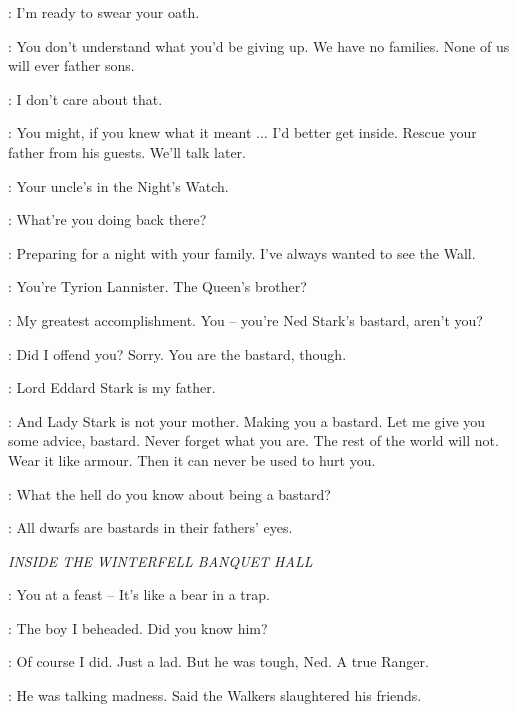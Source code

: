 \JON: I'm ready to swear your oath. 

\BENJEN: You don't understand what you'd be giving up. We have no families. None of us will ever father sons. 

\JON: I don't care about that. 

\BENJEN: You might, if you knew what it meant $\ldots$ I'd better get inside. Rescue your father from his guests. We'll talk later. 


\TYRION: Your uncle's in the Night's Watch. 

\JON: What're you doing back there? 

\TYRION: Preparing for a night with your family. I've always wanted to see the Wall. 

\JON: You're Tyrion Lannister. The Queen's brother? 

\TYRION: My greatest accomplishment. You -- you're Ned Stark's bastard, aren't you? 


\TYRION: Did I offend you? Sorry. You are the bastard, though. 

\JON: Lord Eddard Stark is my father. 

\TYRION: And Lady Stark is not your mother. Making you a bastard. Let me give you some advice, bastard. Never forget what you are. The rest of the world will not. Wear it like armour. Then it can never be used to hurt you. 

\JON: What the hell do you know about being a bastard? 

\TYRION: All dwarfs are bastards in their fathers' eyes. 



\scene

\textit{INSIDE THE WINTERFELL BANQUET HALL} 


\BENJEN: You at a feast -- It's like a bear in a trap. 

\NED: The boy I beheaded. Did you know him? 

\BENJEN: Of course I did. Just a lad. But he was tough, Ned. A true Ranger. 

\NED: He was talking madness. Said the Walkers slaughtered his friends. 

